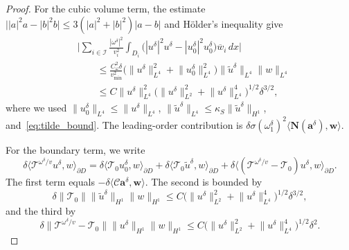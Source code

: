 \documentclass[a4paper,reqno,twoside]{amsart}
\numberwithin{equation}{section}
\theoremstyle{definition}
\renewcommand{\tilde}{\widetilde}
\newcommand{\<}{\ensuremath \leq}
\renewcommand{\>}{\ensuremath \geq}
\renewcommand{\tilde}{\widetilde}
\begin{document}
\begin{proof}
    For the cubic volume term, the estimate
    $\bigl||a|^2 a - |b|^2 b\bigr| \leq 3(|a|^2 + |b|^2)|a - b|$
    and H\"older's inequality give
    \begin{equation}
        \begin{aligned}
            &\biggl\lvert
            \sum_{i \in \mathcal{I}} \frac{|\omega^\delta|^2}{v_i^2}
            \int_{D_i}
            \bigl(|u^\delta|^2 u^\delta
              - |u_0^\delta|^2 u_0^\delta\bigr)
            \overline{w}_i \, dx \biggr\rvert \\
            &\qquad\leq \frac{C_\omega^2 \delta}{v_{\min}^2}
            \bigl(
              \lVert u^\delta \rVert_{L^4}^2
              + \lVert u_0^\delta \rVert_{L^4}^2
            \bigr)
            \lVert \tilde{u}^\delta \rVert_{L^4}
            \lVert w \rVert_{L^4} \\
            &\qquad\leq C \lVert u^\delta \rVert_{L^4}^2
            \bigl( \lVert u^\delta \rVert_{L^2}^2
              + \lVert u^\delta \rVert_{L^4}^4 \bigr)^{1/2}
            \delta^{3/2},
        \end{aligned}
    \end{equation}
    where we used $\lVert u_0^\delta \rVert_{L^4}
    \leq \lVert u^\delta \rVert_{L^4}$,
    $\lVert \tilde{u}^\delta \rVert_{L^4}
    \leq \kappa_S \lVert \tilde{u}^\delta \rVert_{H^1}$,
    and~\eqref{eq:tilde_bound}. The leading-order contribution is
    $\delta \sigma (\omega_1^\delta)^2
    \langle \mathbf{N}(\mathbf{a}^\delta), \mathbf{w} \rangle$.

    For the boundary term, we write
    \begin{equation}
        \delta \langle \mathcal{T}^{\omega^\delta/v} u^\delta,
        w \rangle_{\partial D}
        = \delta \langle \mathcal{T}_0 u_0^\delta,
          w \rangle_{\partial D}
        + \delta \langle \mathcal{T}_0 \tilde{u}^\delta,
          w \rangle_{\partial D}
        + \delta \langle (\mathcal{T}^{\omega^\delta/v} - \mathcal{T}_0)
          u^\delta, w \rangle_{\partial D}.
    \end{equation}
    The first term equals
    $-\delta \langle \mathcal{C} \mathbf{a}^\delta,
    \mathbf{w} \rangle$. The second is bounded by
    \begin{equation}
        \delta \lVert \mathcal{T}_0 \rVert
        \lVert \tilde{u}^\delta \rVert_{H^1}
        \lVert w \rVert_{H^1}
        \leq C
        \bigl( \lVert u^\delta \rVert_{L^2}^2
          + \lVert u^\delta \rVert_{L^4}^4 \bigr)^{1/2}
        \delta^{3/2},
    \end{equation}
    and the third by
    \begin{equation}
        \delta \lVert \mathcal{T}^{\omega^\delta/v} - \mathcal{T}_0 \rVert
        \lVert u^\delta \rVert_{H^1}
        \lVert w \rVert_{H^1}
        \leq C
        \bigl( \lVert u^\delta \rVert_{L^2}^2
          + \lVert u^\delta \rVert_{L^4}^4 \bigr)^{1/2}
        \delta^2.
    \end{equation}


\end{proof}
\end{document}
